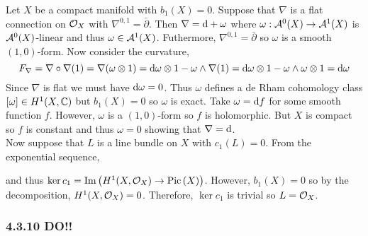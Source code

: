 \documentclass[12pt]{article}
\begin{document}
Let $X$ be a compact \kahler manifold with $b_1(X) = 0$. Suppose that $\nabla$ is a flat connection on $\mathcal{O}_{X}$ with $\nabla^{0,1} = \bar{\partial}$. Then $\nabla = \mathrm{d} + \omega$ where $\omega : \mathcal{A}^0(X) \to \mathcal{A}^1(X)$ is $\mathcal{A}^0(X)$-linear and thus $\omega \in \mathcal{A}^1(X)$. Futhermore, $\nabla^{0,1} = \bar{\partial}$ so $\omega$ is a smooth $(1,0)$-form. Now consider the curvature,
\[ F_\nabla = \nabla \circ \nabla(1) = \nabla (\omega \otimes 1) = \mathrm{d}{\omega} \otimes 1 - \omega \wedge \nabla(1) = \mathrm{d}{\omega} \otimes 1 - \omega \wedge \omega \otimes 1 = \mathrm{d}{\omega} \]
Since $\nabla$ is flat we must have $\mathrm{d}{\omega} = 0$. Thus $\omega$ defines a de Rham cohomology class $[\omega] \in H^1(X, \mathbb{C})$ but $b_1(X) = 0$ so $\omega$ is exact. Take $\omega = \mathrm{d}{f}$ for some smooth function $f$. However, $\omega$ is a $(1,0)$-form so $f$ is holomorphic. But $X$ is compact so $f$ is constant and thus $\omega = 0$ showing that $\nabla = \mathrm{d}$.
\bigskip\\
Now suppose that $L$ is a line bundle on $X$ with $c_1(L) = 0$. From the exponential sequence,
\begin{center}
\end{center}
and thus $\ker{c_1} = \mathrm{Im}\left( H^1(X, \mathcal{O}_{X}) \to \mathrm{Pic} \left( X \right) \right)$. However, $b_1(X) = 0$ so by the \kahler decomposition, $H^1(X, \mathcal{O}_{X}) = 0$. Therefore, $\ker{c_1}$ is trivial so $L = \mathcal{O}_{X}$.

\subsubsection{4.3.10 DO!!}
\end{document}
